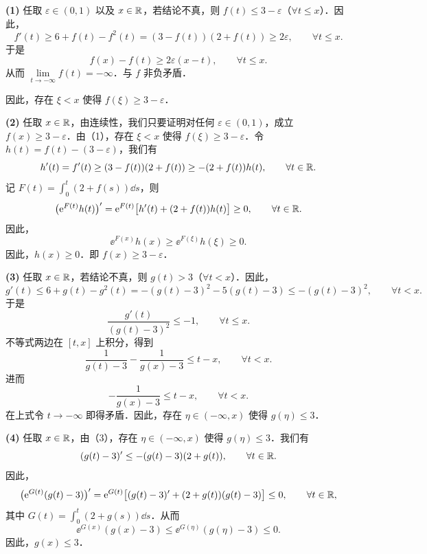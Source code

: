 \begin{solution}
\textbf{(1)} 任取 $\varepsilon\in(0,1)$ 以及 $x\in\mathbb{R}$，若结论不真，则 $f(t)\le 3-\varepsilon$（$\forall t\le x$）．因此，
\[
  f'(t)\ge 6+f(t)-f^2(t)=(3-f(t))(2+f(t))\ge 2\varepsilon,\qquad \forall t\le x.
\]
于是
\[
  f(x)-f(t)\ge 2\varepsilon(x-t),\qquad \forall t\le x.
\]
从而 $\lim\limits_{t\to-\infty}f(t)=-\infty$．与 $f$ 非负矛盾．

因此，存在 $\xi<x$ 使得 $f(\xi)\ge 3-\varepsilon$．

\textbf{(2)} 任取 $x\in\mathbb{R}$，由连续性，我们只要证明对任何 $\varepsilon\in(0,1)$，成立 $f(x)\ge 3-\varepsilon$．由（1），存在 $\xi<x$ 使得 $f(\xi)\ge 3-\varepsilon$．令 $h(t)=f(t)-(3-\varepsilon)$，我们有
\[
  h'(t)=f'(t)\ge(3-f(t))(2+f(t))\ge-(2+f(t))h(t),\qquad \forall t\in\mathbb{R}.
\]
记 $F(t)=\displaystyle\int_0^t(2+f(s))\dd s$，则
\[
  \bigl(\mathrm{e}^{F(t)}h(t)\bigr)'=\mathrm{e}^{F(t)}\bigl[h'(t)+(2+f(t))h(t)\bigr]\ge 0,\qquad \forall t\in\mathbb{R}.
\]
因此，
\[
  \ee^{F(x)}h(x)\ge\ee^{F(\xi)}h(\xi)\ge 0.
\]
因此，$h(x)\ge 0$．即 $f(x)\ge 3-\varepsilon$．

\textbf{(3)} 任取 $x\in\mathbb{R}$，若结论不真，则 $g(t)>3$（$\forall t<x$）．因此，
\[
  g'(t)\le 6+g(t)-g^2(t)=-(g(t)-3)^2-5(g(t)-3)\le-(g(t)-3)^2,\qquad \forall t<x.
\]
于是
\[
  \frac{g'(t)}{(g(t)-3)^2}\le -1,\qquad \forall t\le x.
\]
不等式两边在 $[t,x]$ 上积分，得到
\[
  \frac{1}{g(t)-3}-\frac{1}{g(x)-3}\le t-x,\qquad \forall t<x.
\]
进而
\[
  -\frac{1}{g(x)-3}\le t-x,\qquad \forall t<x.
\]
在上式令 $t\to-\infty$ 即得矛盾．因此，存在 $\eta\in(-\infty,x)$ 使得 $g(\eta)\le 3$．

\textbf{(4)} 任取 $x\in\mathbb{R}$，由（3），存在 $\eta\in(-\infty,x)$ 使得 $g(\eta)\le 3$．我们有
\[
  (g(t)-3)'\le-(g(t)-3)(2+g(t)),\qquad \forall t\in\mathbb{R}.
\]
因此，
\[
  \bigl(\mathrm{e}^{G(t)}(g(t)-3)\bigr)'
  =\mathrm{e}^{G(t)}\bigl[(g(t)-3)'+(2+g(t))(g(t)-3)\bigr]\le 0,\qquad \forall t\in\mathbb{R},
\]
其中 $G(t)=\displaystyle\int_0^t(2+g(s))\dd s$．从而
\[
  \ee^{G(x)}(g(x)-3)\le\ee^{G(\eta)}(g(\eta)-3)\le 0.
\]
因此，$g(x)\le 3$．
\end{solution}
